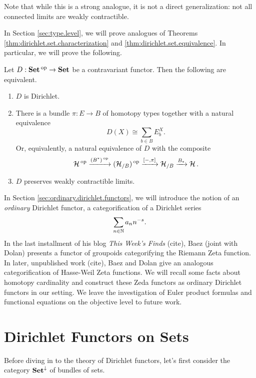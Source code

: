 Note that while this is a strong analogue, it is not a direct generalization:
not all connected limits are weakly contractible.

In Section \ref{sec:type.level}, we will prove analogues of Theorems
\ref{thm:dirichlet.set.characterization} and
\ref{thm:dirichlet.set.equivalence}. In particular, we will prove the following.

\begin{thm}\label{thm:dirichlet.type.characterization}
Let $D : \operatorname{\textbf{Set}}\operatorname{^\text{op}} \to \operatorname{\textbf{Set}}$ be a contravariant functor. Then the following are
equivalent.
\begin{enumerate}
\item $D$ is Dirichlet.
\item There is a bundle $\pi : E \to B$ of homotopy types together with a natural equivalence
  $$D(X) \cong \sum_{b \in B} E_b^X.$$
  Or, equivalently, a natural equivalence of $D$ with the composite
  $$\operatorname{\mathcal{H}}\operatorname{^\text{op}} \xrightarrow{(B^{\ast})\operatorname{^\text{op}}} (\operatorname{\mathcal{H}}_{/B})\operatorname{^\text{op}} \xrightarrow{[-, \pi]} \operatorname{\mathcal{H}}_{/B}
  \xrightarrow{B_{\ast}} \operatorname{\mathcal{H}}.$$
\item $D$ preserves weakly contractible limits.
\end{enumerate}
\end{thm}

In Section \ref{sec:ordinary.dirichlet.functors}, we will introduce the notion
of an \emph{ordinary} Dirichlet functor, a categorification of a Dirichlet
series
$$\sum_{n \in \operatorname{\mathbb{N}}} a_n n^{-s}.$$
In the last installment of his blog \emph{This Week's Finds} (cite), Baez (joint with
Dolan) presents a functor of groupoids categorifying the Riemann Zeta function.
In later, unpublished work (cite), Baez and Dolan give an analogous
categorification of Hasse-Weil Zeta functions. We will recall some facts about
homotopy cardinality and construct these Zeda functors as ordinary Dirichlet
functors in our setting. We leave the investigation of Euler product formulas
and functional equations on the objective level to future work.

\begin{acknowledgements}

\end{acknowledgements}


\section{Dirichlet Functors on Sets} \label{sec:set.level}

Before diving in to the theory of Dirichlet functors, let's first consider the
category $\operatorname{\textbf{Set}}^{\downarrow}$ of bundles of sets.


